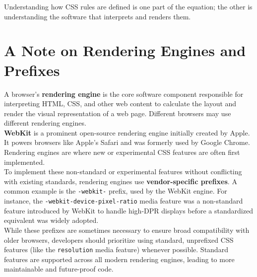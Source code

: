 \documentclass{scrbook}
\begin{document}
Understanding how CSS rules are defined is one part of the equation; the other is understanding the software that interprets and renders them.

\chapter{A Note on Rendering Engines and Prefixes}

A browser's \textbf{rendering engine} is the core software component responsible for interpreting HTML, CSS, and other web content to calculate the layout and render the visual representation of a web page. Different browsers may use different rendering engines. \\

\textbf{WebKit} is a prominent open-source rendering engine initially created by Apple. It powers browsers like Apple's Safari and was formerly used by Google Chrome. Rendering engines are where new or experimental CSS features are often first implemented. \\

To implement these non-standard or experimental features without conflicting with existing standards, rendering engines use \textbf{vendor-specific prefixes}. A common example is the \texttt{-webkit-} prefix, used by the WebKit engine. For instance, the \texttt{-webkit-device-pixel-ratio} media feature was a non-standard feature introduced by WebKit to handle high-DPR displays before a standardized equivalent was widely adopted. \\

While these prefixes are sometimes necessary to ensure broad compatibility with older browsers, developers should prioritize using standard, unprefixed CSS features (like the \texttt{resolution} media feature) whenever possible. Standard features are supported across all modern rendering engines, leading to more maintainable and future-proof code.
\end{document}
